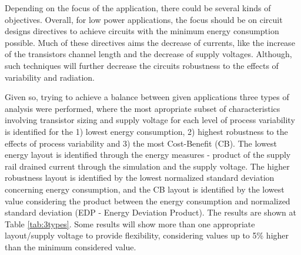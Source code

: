 \documentclass[diss,pgmicro,english]{iiufrgs}
\begin{document}





	Depending on the focus of the application, there could be several kinds of objectives. Overall, for low power applications, the focus should be on circuit designs directives to achieve circuits with the minimum energy consumption possible. Much of these directives aims the decrease of currents, like the increase of the transistors channel length and the decrease of supply voltages. Although, such techniques will further decrease the circuits robustness to the effects of variability and radiation.

Given so, trying to achieve a balance between given applications three types of analysis were performed, where the most apropriate subset of characteristics involving transistor sizing and supply voltage for each level of process variability is identified for the 1) lowest energy consumption, 2) highest robustness to the effects of process variability and 3) the most Cost-Benefit (CB). The lowest energy layout is identified through the energy measures - product of the supply rail drained current through the simulation and the supply voltage. The higher robustness layout is identified by the lowest normalized standard deviation concerning energy consumption, and the CB layout is identified by the lowest value considering the product between the energy consumption and normalized standard deviation (EDP - Energy Deviation Product). The results are shown at Table \ref{tab:3types}. Some results will show more than one appropriate layout/supply voltage to provide flexibility, considering values up to 5\% higher than the minimum considered value.
\end{document}
